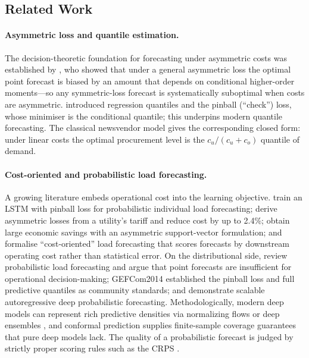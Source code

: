 \documentclass[12pt,a4paper]{article}
\begin{document}
\subsection{Related Work}
\label{sec:related}

\paragraph{Asymmetric loss and quantile estimation.}
The decision-theoretic foundation for forecasting under asymmetric costs was established
by \textcite{christoffersen1997optimal}, who showed that under a general asymmetric loss
the optimal point forecast is biased by an amount that depends on conditional higher-order
moments---so any symmetric-loss forecast is systematically suboptimal when costs are
asymmetric. \textcite{koenker1978regression} introduced regression quantiles and the
pinball (``check'') loss, whose minimiser is the conditional quantile; this underpins
modern quantile forecasting. The classical newsvendor model
\parencite{arrow1951optimal} gives the corresponding closed form: under linear costs the
optimal procurement level is the $c_u/(c_u+c_o)$ quantile of demand.

\paragraph{Cost-oriented and probabilistic load forecasting.}
A growing literature embeds operational cost into the learning objective.
\textcite{wang2019pinball} train an LSTM with pinball loss for probabilistic individual
load forecasting; \textcite{lin2020asymmetric} derive asymmetric losses from a utility's
tariff and reduce cost by up to 2.4\%; \textcite{wu2021svr} obtain large economic
savings with an asymmetric support-vector formulation; and
\textcite{zhang2022costoriented} formalise ``cost-oriented'' load forecasting that scores
forecasts by downstream operating cost rather than statistical error. On the
distributional side, \textcite{hong2016probabilistic} review probabilistic load
forecasting and argue that point forecasts are insufficient for operational
decision-making; GEFCom2014 \parencite{hong2016gefcom2014} established the pinball loss
and full predictive quantiles as community standards; and \textcite{salinas2020deepar}
demonstrate scalable autoregressive deep probabilistic forecasting. Methodologically,
modern deep models can represent rich predictive densities via normalizing flows
\parencite{rezende2015variational,papamakarios2021normalizing} or deep ensembles
\parencite{lakshminarayanan2017simple}, and conformal prediction
\parencite{vovk2005algorithmic,romano2019conformalized} supplies finite-sample coverage
guarantees that pure deep models lack. The quality of a probabilistic forecast is judged
by strictly proper scoring rules such as the CRPS \parencite{gneiting2007strictly}.
\end{document}
